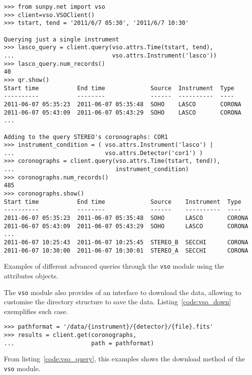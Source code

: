 \begin{listing}[h]
\begin{verbatim}
>>> from sunpy.net import vso
>>> client=vso.VSOClient()
>>> tstart, tend = '2011/6/7 05:30', '2011/6/7 10:30'

Querying just a single instrument
>>> lasco_query = client.query(vso.attrs.Time(tstart, tend), 
...                            vso.attrs.Instrument('lasco'))
>>> lasco_query.num_records()
40
>>> qr.show() 
Start time           End time             Source  Instrument  Type  
----------           --------             ------  ----------  ----  
2011-06-07 05:35:23  2011-06-07 05:35:48  SOHO    LASCO       CORONA
2011-06-07 05:43:09  2011-06-07 05:43:29  SOHO    LASCO       CORONA
...

Adding to the query STEREO's coronographs: COR1
>>> instrument_condition = ( vso.attrs.Instrument('lasco') | 
...                          vso.attrs.Detector('cor1') )
>>> coronographs = client.query(vso.attrs.Time(tstart, tend)), 
...                             instrument_condition)
>>> coronographs.num_records()
485
>>> coronographs.show() 
Start time           End time             Source    Instrument  Type  
----------           --------             ------    ----------  ----  
2011-06-07 05:35:23  2011-06-07 05:35:48  SOHO      LASCO       CORONA
2011-06-07 05:43:09  2011-06-07 05:43:29  SOHO      LASCO       CORONA
...
2011-06-07 10:25:43  2011-06-07 10:25:45  STEREO_B  SECCHI      CORONA
2011-06-07 10:30:00  2011-06-07 10:30:01  STEREO_A  SECCHI      CORONA
\end{verbatim}
\caption{Examples of different advanced queries through the \texttt{vso} 
  module using the attributes objects.}
\label{code:vso_query}
\end{listing}

The \texttt{vso} module also provides of an interface to download the data,
allowing to customise the directory structure to save the data.
Listing~\ref{code:vso_down} exemplifies such case.


\begin{listing}[h]
\begin{verbatim}
>>> pathformat = '/data/{instrument}/{detector}/{file}.fits'
>>> results = client.get(coronographs, 
...                      path = pathformat)

\end{verbatim}
\caption{From listing~\ref{code:vso_query}, this examples shows the 
  download method of the \texttt{vso} module.}
\label{code:vso_down}
\end{listing}
